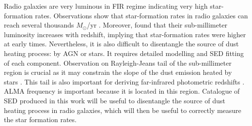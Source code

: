 Radio galaxies are very luminous in FIR regime indicating very high star-formation rates. Observations show that star-formation rates in radio galaxies can reach several thousands $M_{\odot}$/yr \cite[e.g.,][]{archibald2001, drouart2014}. Moreover, \cite{miley2008} found that their sub-millimeter luminosity increases with redshift, implying that star-formation rates were higher at early times. Nevertheless, it is also difficult to disentangle the source of dust heating process: by AGN or stars. It requires detailed modelling and SED fitting of each component. Observation on Rayleigh-Jeans tail of the sub-millimeter region is crucial as it may constrain the slope of the dust emission heated by stars \citep{drouart2014}. This tail is also important for deriving far-infrared photometric redshifts \citep{wylezalek2013b}.  ALMA frequency is important because it is located in this region. Catalogue of SED produced in this work will be useful to disentangle the source of dust heating process in radio galaxies, which will then be useful to correctly measure the star formation rates.



\cleardoublepage
